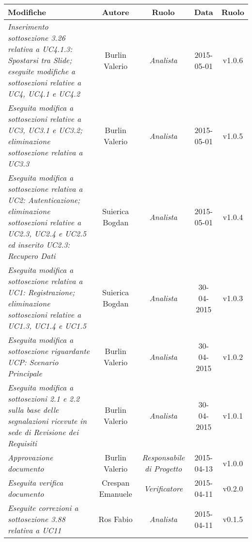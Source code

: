 \newpage
\begin{table}[h]
\centering
\begin{tabular}{|p{}|c|c|c|c|}
	\toprule
		\textbf{Modifiche} & \textbf{Autore} & \textbf{Ruolo} & \textbf{Data} & \textbf{Ruolo} \\
	\midrule
	\midrule
		\textit{Inserimento sottosezione 3.26 relativa a UC4.1.3: Spostarsi tra Slide; eseguite modifiche a sottosezioni relative a UC4, UC4.1 e UC4.2} & Burlin Valerio & \textit{Analista} & 2015-05-01 & v1.0.6 \\ 
	\midrule
		\textit{Eseguita modifica a sottosezioni relative a UC3, UC3.1 e UC3.2; eliminazione sottosezione relativa a UC3.3} & Burlin Valerio & \textit{Analista} & 2015-05-01 & v1.0.5 \\
	\midrule
		\textit{Eseguita modifica a sottosezione relativa a UC2: Autenticazione; eliminazione sottosezioni relative a UC2.3, UC2.4 e UC2.5 ed inserito UC2.3: Recupero Dati} & Suierica Bogdan & \textit{Analista} & 2015-05-01 & v1.0.4 \\ 
	\midrule
		\textit{Eseguita modifica a sottosezione relativa a UC1: Registrazione; eliminazione sottosezioni relative a UC1.3, UC1.4 e UC1.5} & Suierica Bogdan & \textit{Analista} & 30-04-2015 & v1.0.3 \\
	\midrule
		\textit{Eseguita modifica a sottosezione riguardante UCP: Scenario Principale} & Burlin Valerio & \textit{Analista} & 30-04-2015 & v1.0.2 \\
	\midrule
		\textit{Eseguita modifica a sottosezioni 2.1 e 2.2 sulla base delle segnalazioni ricevute in sede di Revisione dei Requisiti} & Burlin Valerio & \textit{Analista} & 30-04-2015 & v1.0.1 \\
	\midrule
		\textit{Approvazione documento} & Burlin Valerio & \textit{Responsabile di Progetto} & 2015-04-13 & v1.0.0 \\
	\midrule
		\textit{Eseguita verifica documento} & Crespan Emanuele & \textit{Verificatore} & 2015-04-11 & v0.2.0 \\
	\midrule
		\textit{Eseguite correzioni a sottosezione 3.88 relativa a UC11} & Ros Fabio & \textit{Analista} & 2015-04-11 & v0.1.5 \\
	\bottomrule
\end{tabular}	
\end{table}
\newpage
